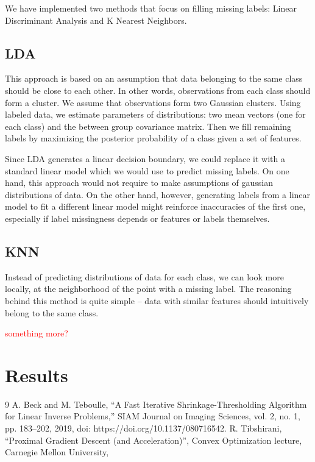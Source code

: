 \documentclass{article}
\begin{document}
We have implemented two methods that focus on filling missing labels: Linear Discriminant Analysis and K Nearest Neighbors.

\subsection{LDA}

This approach is based on an assumption that data belonging to the same class should be close to each other. In other words, observations from each class should form a cluster. We assume that observations form two Gaussian clusters. Using labeled data, we estimate parameters of distributions: two mean vectors (one for each class) and the between group covariance matrix. Then we fill remaining labels by maximizing the posterior probability of a class given a set of features.

Since LDA generates a linear decision boundary, we could replace it with a standard linear model which we would use to predict missing labels. On one hand, this approach would not require to make assumptions of gaussian distributions of data. On the other hand, however, generating labels from a linear model to fit a different linear model might reinforce inaccuracies of the first one, especially if label missingness depends or features or labels themselves.

\subsection{KNN}

Instead of predicting distributions of data for each class, we can look more locally, at the neighborhood of the point with a missing label. The reasoning behind this method is quite simple -- data with similar features should intuitively belong to the same class. 

\textcolor{red}{something more?}

\section{Results}


\newpage
\begin{thebibliography}{9}
A. Beck and M. Teboulle, “A Fast Iterative Shrinkage-Thresholding Algorithm for Linear Inverse Problems,” SIAM Journal on Imaging Sciences, vol. 2, no. 1, pp. 183–202, 2019, doi: https://doi.org/10.1137/080716542.
R. Tibshirani, “Proximal Gradient Descent (and Acceleration)”, Convex Optimization lecture, Carnegie Mellon University, 
\end{thebibliography}
\end{document}
